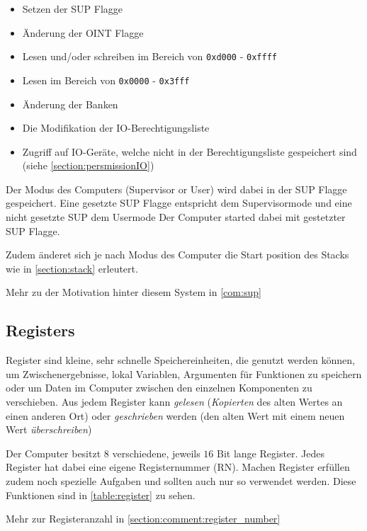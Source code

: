 \documentclass{scrartcl}
\begin{document}
\begin{itemize}
	\item Setzen der SUP Flagge
	\item Änderung der OINT Flagge
	\item Lesen und/oder schreiben im Bereich von \texttt{0xd000} - \texttt{0xffff}
	\item Lesen im Bereich von \texttt{0x0000} - \texttt{0x3fff}
	\item Änderung der Banken
	\item Die Modifikation der IO-Berechtigungsliste
	\item Zugriff auf IO-Geräte, welche nicht in der Berechtigungsliste gespeichert sind (siehe \autoref{section:persmissionIO})
\end{itemize}

Der Modus des Computers (Supervisor or User) wird dabei in der SUP Flagge gespeichert. Eine gesetzte SUP Flagge entspricht dem Supervisormode und eine nicht gesetzte SUP dem Usermode Der Computer started dabei mit gestetzter SUP Flagge.

Zudem änderet sich je nach Modus des Computer die Start position des Stacks wie in \autoref{section:stack} erleutert.

Mehr zu der Motivation hinter diesem System in \autoref{com:sup}



\subsection{Registers}
Register sind kleine, sehr schnelle Speichereinheiten, die genutzt werden können, um Zwischenergebnisse, lokal Variablen, Argumenten für Funktionen zu speichern oder um Daten im Computer zwischen den einzelnen Komponenten zu verschieben. Aus jedem Register kann \emph{gelesen} (\emph{Kopierten} des alten Wertes an einen anderen Ort) oder \emph{geschrieben} werden (den alten Wert mit einem neuen Wert \emph{überschreiben})

Der Computer besitzt $8$ verschiedene, jeweils $16$ Bit lange Register. Jedes Register hat dabei eine eigene Registernummer (RN). Machen Register erfüllen zudem noch spezielle Aufgaben und sollten auch nur so verwendet werden. Diese Funktionen sind in \autoref{table:register} zu sehen.

Mehr zur Registeranzahl in \autoref{section:comment:register_number}
\end{document}
